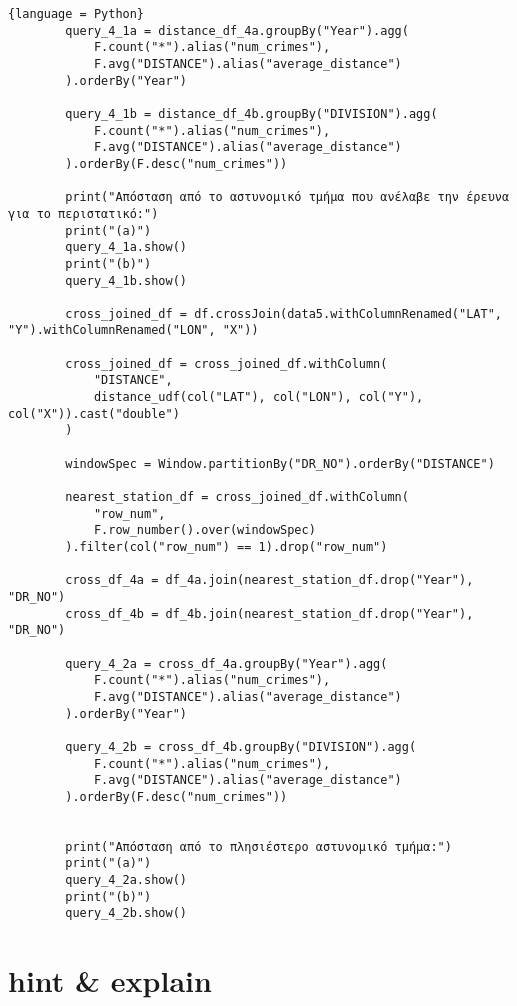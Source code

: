\documentclass{article}
\begin{document}
\begin{lstlisting}{language = Python}
        query_4_1a = distance_df_4a.groupBy("Year").agg(
            F.count("*").alias("num_crimes"),
            F.avg("DISTANCE").alias("average_distance")
        ).orderBy("Year")

        query_4_1b = distance_df_4b.groupBy("DIVISION").agg(
            F.count("*").alias("num_crimes"),
            F.avg("DISTANCE").alias("average_distance")
        ).orderBy(F.desc("num_crimes"))

        print("Απόσταση από το αστυνομικό τμήμα που ανέλαβε την έρευνα για το περιστατικό:")
        print("(a)")
        query_4_1a.show() 
        print("(b)")
        query_4_1b.show() 

        cross_joined_df = df.crossJoin(data5.withColumnRenamed("LAT", "Y").withColumnRenamed("LON", "X"))

        cross_joined_df = cross_joined_df.withColumn(
            "DISTANCE",
            distance_udf(col("LAT"), col("LON"), col("Y"), col("X")).cast("double")
        )

        windowSpec = Window.partitionBy("DR_NO").orderBy("DISTANCE")

        nearest_station_df = cross_joined_df.withColumn(
            "row_num",
            F.row_number().over(windowSpec)
        ).filter(col("row_num") == 1).drop("row_num")

        cross_df_4a = df_4a.join(nearest_station_df.drop("Year"), "DR_NO")
        cross_df_4b = df_4b.join(nearest_station_df.drop("Year"), "DR_NO")

        query_4_2a = cross_df_4a.groupBy("Year").agg(
            F.count("*").alias("num_crimes"),
            F.avg("DISTANCE").alias("average_distance")
        ).orderBy("Year")

        query_4_2b = cross_df_4b.groupBy("DIVISION").agg(
            F.count("*").alias("num_crimes"),
            F.avg("DISTANCE").alias("average_distance")
        ).orderBy(F.desc("num_crimes"))


        print("Απόσταση από το πλησιέστερο αστυνομικό τμήμα:")
        print("(a)")
        query_4_2a.show()
        print("(b)")
        query_4_2b.show()
\end{lstlisting}


\section*{hint \& explain}
\end{document}
